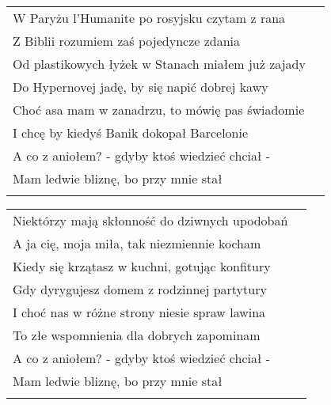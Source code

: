 \documentclass[a5paper]{article}
\begin{document}
\noindent
{}
\begin{tabular}{@{}p{9.5cm}p{3cm}@{}}
\noindent
W Paryżu l'Humanite po rosyjsku czytam z rana	\\
Z Biblii rozumiem zaś pojedyncze zdania	\\
Od plastikowych łyżek w Stanach miałem już zajady	\\
Do Hypernovej jadę, by się napić dobrej kawy	\\
Choć asa mam w zanadrzu, to mówię pas świadomie	\\
I chcę by kiedyś Banik dokopał Barcelonie	\\
A co z aniołem? - gdyby ktoś wiedzieć chciał -\\
Mam ledwie bliznę, bo przy mnie stał	\\ \\
\end{tabular}

\noindent
{}
\begin{tabular}{@{}p{9.5cm}p{3cm}@{}}
\noindent
Niektórzy mają skłonność do dziwnych upodobań	 \\
A ja cię, moja miła, tak niezmiennie kocham	 \\
Kiedy się krzątasz w kuchni, gotując konfitury	\\
Gdy dyrygujesz domem z rodzinnej partytury	\\
I choć nas w różne strony niesie spraw lawina	\\
To złe wspomnienia dla dobrych zapominam	\\
A co z aniołem? - gdyby ktoś wiedzieć chciał -	\\
Mam ledwie bliznę, bo przy mnie stał \\ \\
\end{tabular}
\end{document}
